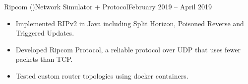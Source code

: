 \begin{cvsubsection}{Ripcom \normalfont(\href{ https://github.com/a3y3/Ripcom}{})}{Network Simulator + Protocol}{February 2019 -- April 2019}
	\begin{itemize}
        \item Implemented RIPv2 in Java including Split Horizon, Poisoned Reverse and Triggered Updates.
        \item Developed Ripcom Protocol, a reliable protocol over UDP that uses fewer packets than TCP.
        \item Tested custom router topologies using docker containers.
	\end{itemize}
\end{cvsubsection}